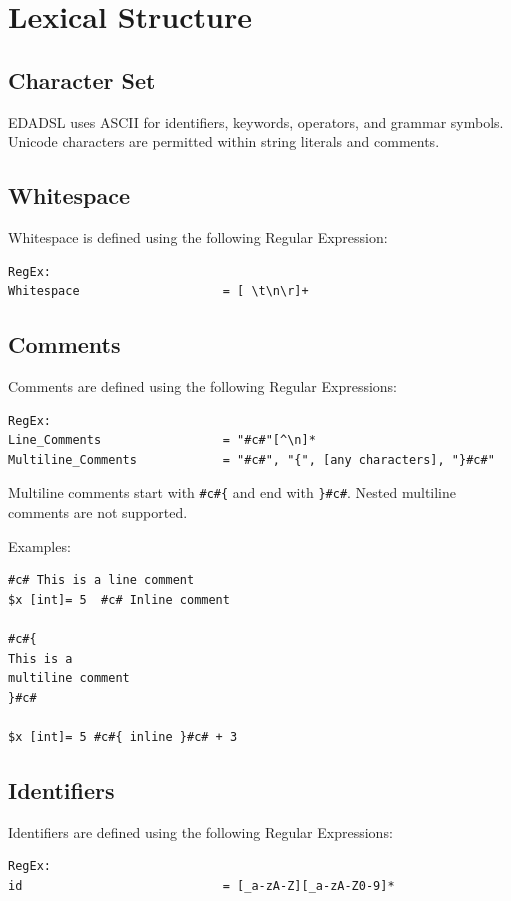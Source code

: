 \chapter{Lexical Structure}
\section{Character Set}
EDADSL uses ASCII for identifiers, keywords, operators, and grammar symbols. Unicode characters are permitted within string literals and comments.
\section{Whitespace}
Whitespace is defined using the following Regular Expression:
\begin{verbatim}
RegEx:
Whitespace                    = [ \t\n\r]+
\end{verbatim}

\section{Comments}
Comments are defined using the following Regular Expressions:
\begin{verbatim}
RegEx:
Line_Comments                 = "#c#"[^\n]*
Multiline_Comments            = "#c#", "{", [any characters], "}#c#"
\end{verbatim}

Multiline comments start with \texttt{\#c\#\{} and end with \texttt{\}\#c\#}. Nested multiline comments are not supported.

Examples:
\begin{verbatim}
#c# This is a line comment
$x [int]= 5  #c# Inline comment

#c#{
This is a
multiline comment
}#c#

$x [int]= 5 #c#{ inline }#c# + 3
\end{verbatim}

\section{Identifiers}
Identifiers are defined using the following Regular Expressions:
\begin{verbatim}
RegEx:
id                            = [_a-zA-Z][_a-zA-Z0-9]*
\end{verbatim}

